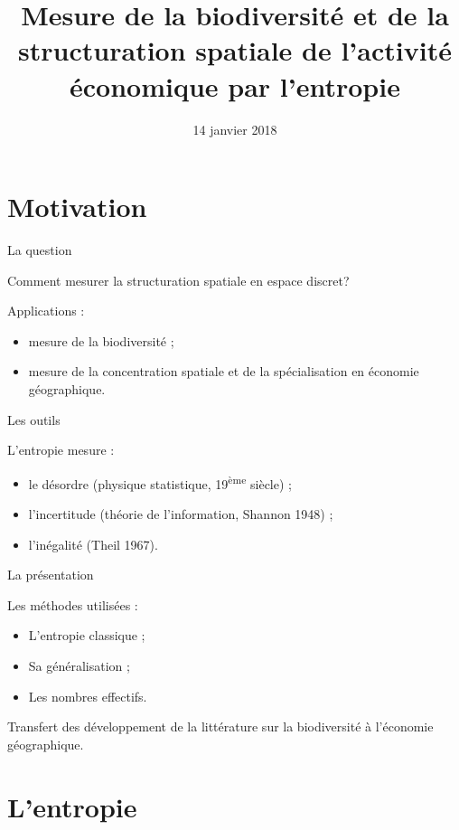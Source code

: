 \documentclass[ignorenonframetext,]{beamer}
\title{Mesure de la biodiversité et de la structuration spatiale de l'activité
économique par l'entropie}
\date{14 janvier 2018}
\begin{document}
\frame{\titlepage}

\section{Motivation}\label{motivation}

\begin{frame}{La question}

Comment mesurer la structuration spatiale en espace discret?

Applications :

\begin{itemize}
\item
  mesure de la biodiversité ;
\item
  mesure de la concentration spatiale et de la spécialisation en
  économie géographique.
\end{itemize}

\end{frame}

\begin{frame}{Les outils}

L'entropie mesure :

\begin{itemize}
\item
  le désordre (physique statistique, 19\textsuperscript{ème} siècle) ;
\item
  l'incertitude (théorie de l'information, Shannon 1948) ;
\item
  l'inégalité (Theil 1967).
\end{itemize}

\end{frame}

\begin{frame}{La présentation}

Les méthodes utilisées :

\begin{itemize}
\item
  L'entropie classique ;
\item
  Sa généralisation ;
\item
  Les nombres effectifs.
\end{itemize}

Transfert des développement de la littérature sur la biodiversité à
l'économie géographique.

\end{frame}

\section{L'entropie}\label{lentropie}
\end{document}
